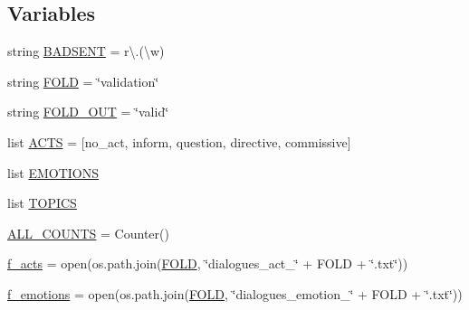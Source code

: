 \subsection*{Variables}
\begin{DoxyCompactItemize}
\item 
string \hyperlink{namespaceparlai_1_1tasks_1_1dailydialog_1_1parse_ab81027afb6e00df2a610bb3d3c77e11b}{B\+A\+D\+S\+E\+NT} = r\textquotesingle{}\textbackslash{}.(\textbackslash{}w)\textquotesingle{}
\item 
string \hyperlink{namespaceparlai_1_1tasks_1_1dailydialog_1_1parse_a8c9e030332871e8cb356bcb74c0ddc8c}{F\+O\+LD} = \char`\"{}validation\char`\"{}
\item 
string \hyperlink{namespaceparlai_1_1tasks_1_1dailydialog_1_1parse_ae6d3cefc4e18c51bfedecae2c5bc875d}{F\+O\+L\+D\+\_\+\+O\+UT} = \char`\"{}valid\char`\"{}
\item 
list \hyperlink{namespaceparlai_1_1tasks_1_1dailydialog_1_1parse_a780ada59eb3694949604bb14d68e2465}{A\+C\+TS} = \mbox{[}\textquotesingle{}no\+\_\+act\textquotesingle{}, \textquotesingle{}inform\textquotesingle{}, \textquotesingle{}question\textquotesingle{}, \textquotesingle{}directive\textquotesingle{}, \textquotesingle{}commissive\textquotesingle{}\mbox{]}
\item 
list \hyperlink{namespaceparlai_1_1tasks_1_1dailydialog_1_1parse_a4dcf4c3798e88e5b49c655dee367234d}{E\+M\+O\+T\+I\+O\+NS}
\item 
list \hyperlink{namespaceparlai_1_1tasks_1_1dailydialog_1_1parse_a567cf2e7cf2a587676683cf7a0860ac9}{T\+O\+P\+I\+CS}
\item 
\hyperlink{namespaceparlai_1_1tasks_1_1dailydialog_1_1parse_a1b9c736e5b172f676234ff6d85390763}{A\+L\+L\+\_\+\+C\+O\+U\+N\+TS} = Counter()
\item 
\hyperlink{namespaceparlai_1_1tasks_1_1dailydialog_1_1parse_a770d23d03169b162728cd3059fb9ac6e}{f\+\_\+acts} = open(os.\+path.\+join(\hyperlink{namespaceparlai_1_1tasks_1_1dailydialog_1_1parse_a8c9e030332871e8cb356bcb74c0ddc8c}{F\+O\+LD}, \char`\"{}dialogues\+\_\+act\+\_\+\char`\"{} + F\+O\+LD + \char`\"{}.txt\char`\"{}))
\item 
\hyperlink{namespaceparlai_1_1tasks_1_1dailydialog_1_1parse_a6dacd6c7ec446b2a8c20bce692c3f0a2}{f\+\_\+emotions} = open(os.\+path.\+join(\hyperlink{namespaceparlai_1_1tasks_1_1dailydialog_1_1parse_a8c9e030332871e8cb356bcb74c0ddc8c}{F\+O\+LD}, \char`\"{}dialogues\+\_\+emotion\+\_\+\char`\"{} + F\+O\+LD + \char`\"{}.txt\char`\"{}))
\item 

\end{DoxyCompactItemize}
